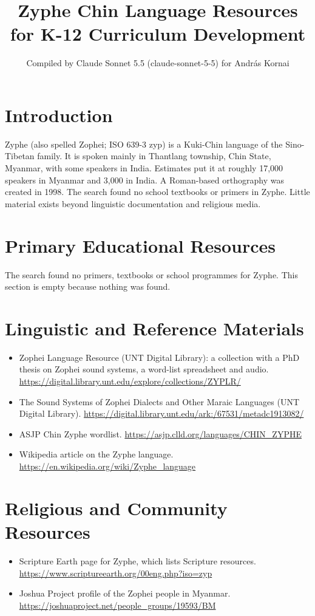 \documentclass[12pt]{article}
\title{Zyphe Chin Language Resources for K-12 Curriculum Development}
\author{Compiled by Claude Sonnet 5.5 (claude-sonnet-5-5) for Andr\'as Kornai}
\date{}
\begin{document}
\maketitle

\section{Introduction}
Zyphe (also spelled Zophei; ISO 639-3 zyp) is a Kuki-Chin language of the Sino-Tibetan family. It is spoken mainly in Thantlang township, Chin State, Myanmar, with some speakers in India. Estimates put it at roughly 17,000 speakers in Myanmar and 3,000 in India. A Roman-based orthography was created in 1998. The search found no school textbooks or primers in Zyphe. Little material exists beyond linguistic documentation and religious media.

\section{Primary Educational Resources}
The search found no primers, textbooks or school programmes for Zyphe. This section is empty because nothing was found.

\section{Linguistic and Reference Materials}
\begin{itemize}
\item Zophei Language Resource (UNT Digital Library): a collection with a PhD thesis on Zophei sound systems, a word-list spreadsheet and audio. \url{https://digital.library.unt.edu/explore/collections/ZYPLR/}
\item The Sound Systems of Zophei Dialects and Other Maraic Languages (UNT Digital Library). \url{https://digital.library.unt.edu/ark:/67531/metadc1913082/}
\item ASJP Chin Zyphe wordlist. \url{https://asjp.clld.org/languages/CHIN_ZYPHE}
\item Wikipedia article on the Zyphe language. \url{https://en.wikipedia.org/wiki/Zyphe_language}
\end{itemize}

\section{Religious and Community Resources}
\begin{itemize}
\item Scripture Earth page for Zyphe, which lists Scripture resources. \url{https://www.scriptureearth.org/00eng.php?iso=zyp}
\item Joshua Project profile of the Zophei people in Myanmar. \url{https://joshuaproject.net/people_groups/19593/BM}
\end{itemize}
\end{document}
